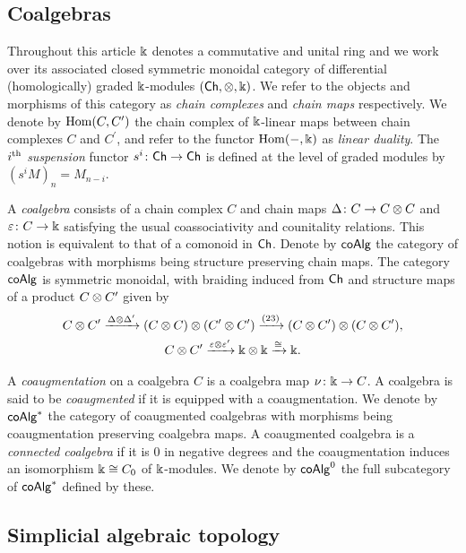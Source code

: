 \subsection{Coalgebras}\label{ss:coalgebras}

Throughout this article $\Bbbk$ denotes a commutative and unital ring and we work over its associated closed symmetric monoidal category of differential (homologically) graded $\Bbbk$-modules $(\mathsf{Ch}, \otimes, \Bbbk)$.
We refer to the objects and morphisms of this category as \textit{chain complexes} and \textit{chain maps} respectively.
We denote by $\mathrm{Hom}(C, C^\prime)$ the chain complex of $\Bbbk$-linear maps between chain complexes $C$ and $C^\prime$, and refer to the functor $\mathrm{Hom}(-, \Bbbk)$ as \textit{linear duality}.
The $i^{\mathrm{th}}$ \textit{suspension} functor $s^i \colon \mathsf{Ch} \to \mathsf{Ch}$ is defined at the level of graded modules by $(s^{i}M)_n = M_{n-i}$.

A \textit{coalgebra} consists of a chain complex $C$ and chain maps $\Delta \colon C \to C \otimes C$ and $\varepsilon \colon C \to \Bbbk$ satisfying the usual coassociativity and counitality relations.
This notion is equivalent to that of a comonoid in $\mathsf{Ch}$.
Denote by $\mathsf{coAlg}$ the category of coalgebras with morphisms being structure preserving chain maps.
The category $\mathsf{coAlg}$ is symmetric monoidal, with braiding induced from $\mathsf{Ch}$ and structure maps of a product $C \otimes C^\prime$ given by
\begin{gather*}
	C \otimes C^\prime \xrightarrow{\Delta \otimes \Delta^\prime}
	(C \otimes C) \otimes (C^\prime \otimes C^\prime) \xrightarrow{(23)}
	(C \otimes C^\prime) \otimes (C \otimes C^\prime), \\
	C \otimes C^\prime \xrightarrow{\varepsilon \otimes \varepsilon^\prime}
	\Bbbk \otimes \Bbbk \xrightarrow{\cong} \Bbbk.
\end{gather*}

A \textit{coaugmentation} on a coalgebra $C$ is a coalgebra map $\nu \colon \Bbbk \to C$.
A coalgebra is said to be \textit{coaugmented} if it is equipped with a coaugmentation.
We denote by $\mathsf{coAlg}^\ast$ the category of coaugmented coalgebras with morphisms being coaugmentation preserving coalgebra maps.
A coaugmented coalgebra is a \textit{connected coalgebra} if it is $0$ in negative degrees and the coaugmentation induces an isomorphism $\Bbbk \cong C_0$ of $\Bbbk$-modules.
We denote by $\mathsf{coAlg}^0$ the full subcategory of $\mathsf{coAlg}^\ast$ defined by these.

\subsection{Simplicial algebraic topology}\label{ss:simplicial}

